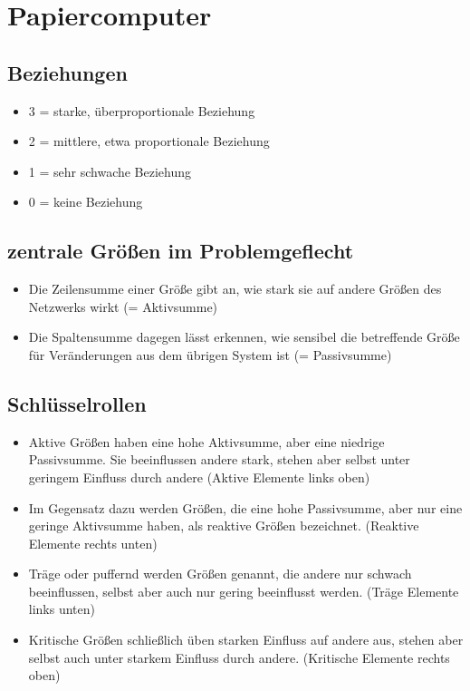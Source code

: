 \documentclass[a4paper,12pt]{scrartcl}
\begin{document}
\section{Papiercomputer}
\subsection{Beziehungen}
\begin{itemize}
\item 3 = starke, überproportionale Beziehung
\item 2 = mittlere, etwa proportionale Beziehung
\item 1 = sehr schwache Beziehung
\item 0 = keine Beziehung
\end{itemize}

\subsection{zentrale Größen im Problemgeflecht}
\begin{itemize}
\item Die Zeilensumme einer Größe gibt an, wie stark sie auf andere Größen des Netzwerks wirkt (= Aktivsumme)
\item Die Spaltensumme dagegen lässt erkennen, wie sensibel die betreffende Größe für Veränderungen aus dem übrigen System ist (= Passivsumme)
\end{itemize}

\subsection{Schlüsselrollen}
\begin{itemize}
\item Aktive Größen haben eine hohe Aktivsumme, aber eine niedrige Passivsumme. Sie beeinflussen andere stark, stehen aber selbst unter geringem Einfluss durch andere (Aktive Elemente links oben)
\item  Im Gegensatz dazu werden Größen, die eine hohe Passivsumme, aber nur eine geringe Aktivsumme haben, als reaktive Größen bezeichnet. (Reaktive Elemente rechts unten)
\item Träge oder puffernd werden Größen genannt, die andere nur schwach beeinflussen, selbst aber auch nur gering beeinflusst werden. (Träge Elemente links unten)
\item  Kritische Größen schließlich üben starken Einfluss auf andere aus, stehen aber selbst auch unter starkem Einfluss durch andere. (Kritische Elemente rechts oben)
\end{itemize}
\end{document}
